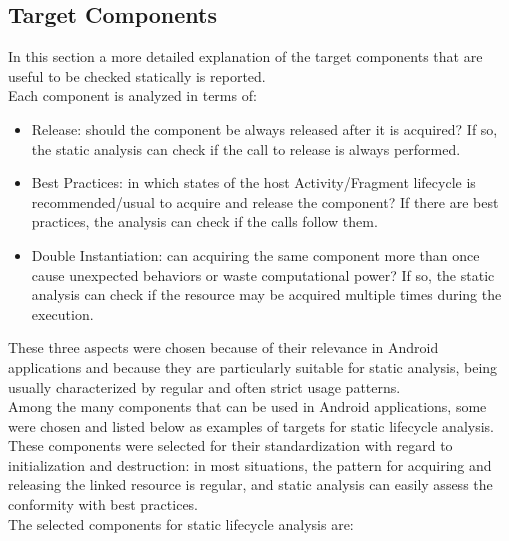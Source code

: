 \documentclass[11pt,a4paper,notitlepage]{article}
\begin{document}
\subsection{Target Components}
In this section a more detailed explanation of the target components that are useful to be checked statically is reported.\bigskip \\
Each component is analyzed in terms of:
\begin{itemize}
	\item Release: should the component be always released after it is acquired? If so, the static analysis can check if the call to release is always performed.
	\item Best Practices: in which states of the host Activity/Fragment lifecycle is recommended/usual to acquire and release the component? If there are best practices, the analysis can check if the calls follow them.
	\item Double Instantiation: can acquiring the same component more than once cause unexpected behaviors or waste computational power? If so, the static analysis can check if the resource may be acquired multiple times during the execution.
\end{itemize}
These three aspects were chosen because of their relevance in Android applications and because they are particularly suitable for static analysis, being usually characterized by regular and often strict usage patterns.\bigskip \\
Among the many components that can be used in Android applications, some were chosen and listed below as examples of targets for static lifecycle analysis. These components were selected for their standardization with regard to initialization and destruction: in most situations, the pattern for acquiring and releasing the linked resource is regular, and static analysis can easily assess the conformity with best practices.\bigskip \\
The selected components for static lifecycle analysis are:
\end{document}
